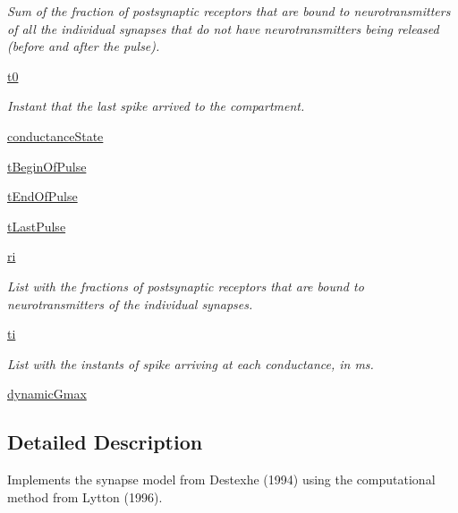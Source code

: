 \begin{DoxyCompactItemize}
\begin{DoxyCompactList}\small\item\em Sum of the fraction of postsynaptic receptors that are bound to neurotransmitters of all the individual synapses that do not have neurotransmitters being released (before and after the pulse). \end{DoxyCompactList}\item 
\hyperlink{class_synapse_1_1_synapse_ad0adf1cb832bd7ce7918f2779171d7d7}{t0}
\begin{DoxyCompactList}\small\item\em Instant that the last spike arrived to the compartment. \end{DoxyCompactList}\item 
\hyperlink{class_synapse_1_1_synapse_a89d3762daa9c60be63403a5ce9fd9a84}{conductance\+State}
\item 
\hyperlink{class_synapse_1_1_synapse_acdc426c52a2a13183d5f8c54a830bfa2}{t\+Begin\+Of\+Pulse}
\item 
\hyperlink{class_synapse_1_1_synapse_adfd02fa815d45efd0cb1bc0124fe2c90}{t\+End\+Of\+Pulse}
\item 
\hyperlink{class_synapse_1_1_synapse_a7df1cc4e7b014e7286b0bbb99079abcf}{t\+Last\+Pulse}
\item 
\hyperlink{class_synapse_1_1_synapse_adc85234a081ad18bf19473be530dcf78}{ri}
\begin{DoxyCompactList}\small\item\em List with the fractions of postsynaptic receptors that are bound to neurotransmitters of the individual synapses. \end{DoxyCompactList}\item 
\hyperlink{class_synapse_1_1_synapse_a714c95723607acad52af96ad55b6c575}{ti}
\begin{DoxyCompactList}\small\item\em List with the instants of spike arriving at each conductance, in ms. \end{DoxyCompactList}\item 
\hyperlink{class_synapse_1_1_synapse_ab987766ddedc7dc1cda9602eef6cb017}{dynamic\+Gmax}
\end{DoxyCompactItemize}


\subsection{Detailed Description}
Implements the synapse model from Destexhe (1994) using the computational method from Lytton (1996). 

